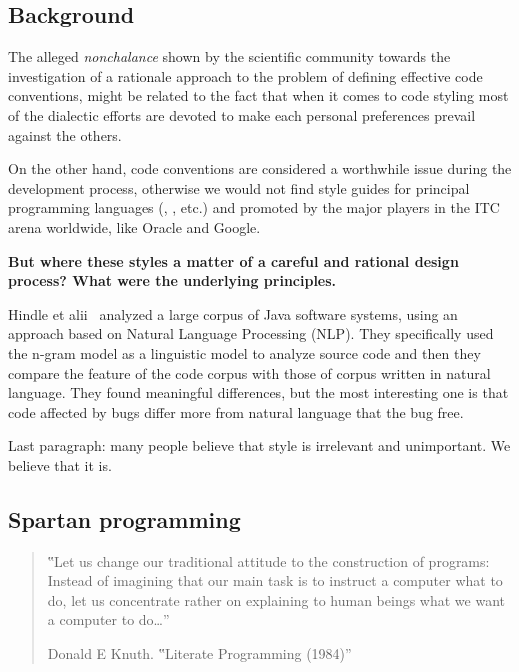 
\subsection{Background}

The alleged \emph{nonchalance} shown by the scientific community towards the
investigation of a rationale approach to the problem of defining effective code
conventions, might be related to the fact that when it comes to code styling
most of the dialectic efforts are devoted to make each personal preferences
prevail against the others.

On the other hand, code conventions are considered a worthwhile issue during
the development process, otherwise we would not find style guides for principal
programming languages (\Java, \CC, etc.) and promoted by the major players in
the ITC arena worldwide, like
Oracle
and Google.

\textbf{But where these styles a matter of a careful and rational design
  process?
What were the underlying principles.}

Hindle et alii~\cite{Hindle:Bar:Su:Gabel:Devanbu:12} analyzed a large corpus of
Java software systems, using an approach based on Natural Language Processing (NLP).
They specifically used the n-gram model as a linguistic model to analyze source code
and then they compare the feature of the code corpus with those of corpus
written in natural language. They found meaningful differences, but the most interesting
one is that code affected by bugs differ more from natural language that the bug free.

Last paragraph: many people believe that style is irrelevant and unimportant.
We believe that it is.

\subsection{Spartan programming}

\begin{quote}
  ‟Let us change our traditional attitude to the construction of programs:
  Instead of imagining that our main task is to instruct a computer what to do,
  let us concentrate rather on explaining to human beings what we want a computer
  to do…”
  \begin{flushright}
   \upshape Donald E Knuth. ‟Literate Programming (1984)”
  \end{flushright}
\end{quote}

